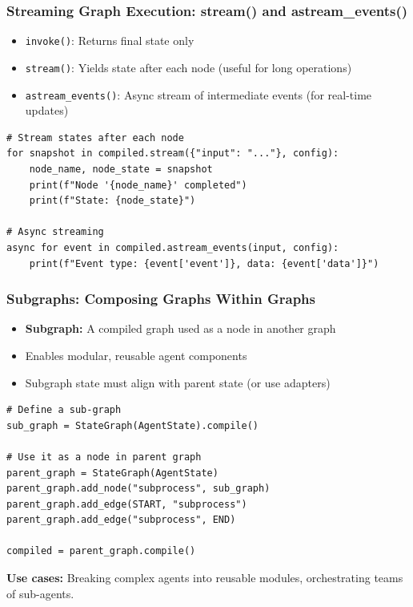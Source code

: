 \documentclass[aspectratio=169,11pt]{beamer}
\begin{document}
\begin{frame}[fragile]
\frametitle{Streaming Graph Execution: stream() and astream\_events()}
\begin{itemize}
    \setlength{\itemsep}{1pt}
  \item \texttt{invoke()}: Returns final state only
  \item \texttt{stream()}: Yields state after each node (useful for long operations)
  \item \texttt{astream\_events()}: Async stream of intermediate events (for real-time updates)
\end{itemize}

\vspace{10pt}
\begin{lstlisting}
# Stream states after each node
for snapshot in compiled.stream({"input": "..."}, config):
    node_name, node_state = snapshot
    print(f"Node '{node_name}' completed")
    print(f"State: {node_state}")

# Async streaming
async for event in compiled.astream_events(input, config):
    print(f"Event type: {event['event']}, data: {event['data']}")
\end{lstlisting}
\end{frame}

\begin{frame}[fragile]
\frametitle{Subgraphs: Composing Graphs Within Graphs}
\begin{itemize}
    \setlength{\itemsep}{1pt}
  \item \textbf{Subgraph:} A compiled graph used as a node in another graph
  \item Enables modular, reusable agent components
  \item Subgraph state must align with parent state (or use adapters)
\end{itemize}

\vspace{10pt}
\begin{lstlisting}
# Define a sub-graph
sub_graph = StateGraph(AgentState).compile()

# Use it as a node in parent graph
parent_graph = StateGraph(AgentState)
parent_graph.add_node("subprocess", sub_graph)
parent_graph.add_edge(START, "subprocess")
parent_graph.add_edge("subprocess", END)

compiled = parent_graph.compile()
\end{lstlisting}

\vspace{10pt}
\textbf{Use cases:} Breaking complex agents into reusable modules, orchestrating teams of sub-agents.
\end{frame}
\end{document}
